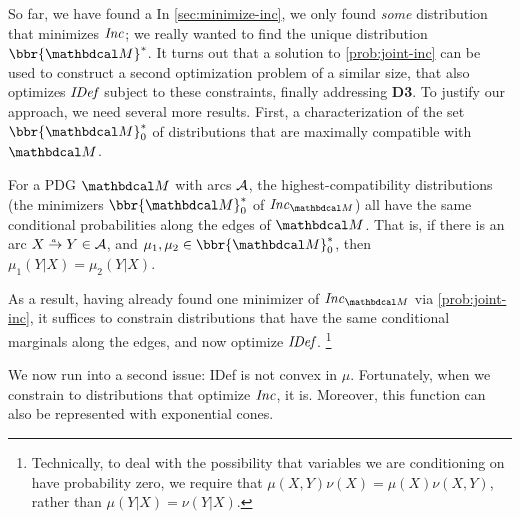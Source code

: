 \documentclass[twoside]{article}
\begin{document}
So far, we have found a
In \cref{sec:minimize-inc}, we only found \emph{some} distribution that minimizes $\mathit{Inc}$; 
we really wanted to find the unique distribution $\bbr{\dg M}^*$.
It turns out that a solution to \eqref{prob:joint-inc} can be used to construct a second optimization problem of a similar size, that also optimizes $\mathit{IDef}_{\!}$ subject to these constraints, finally addressing \textbf{D3}. 
To justify our approach, we need several more results.
First, a characterization of the set $\bbr{\dg M}^*_0$ of distributions that are maximally compatible with $\dg M$. 

\begin{prop}\label{prop:marginonly}
    For a PDG $\dg M$ with arcs $\cal A$,
	the highest-compatibility distributions (the minimizers $\bbr{\dg M}_0^*$ of $\Inc_{\dg M}$) all have the same conditional probabilities along the edges of $\dg M$.   
	That is, if there is an arc $\ed aXY \in \Ar$, and $\mu_1, \mu_2 \in \bbr{\dg M}_0^*$,
    then $\mu_1(Y|X) = \mu_2(Y|X)$.  
\end{prop}

As a result, having already found one minimizer of $\Inc_{\dg M}$ via \eqref{prob:joint-inc}, it suffices to constrain distributions that have the same conditional marginals along the edges, and now optimize $\mathit{IDef}_{\!}$.%
    \footnote{
        Technically, to deal with the possibility that variables we
        are conditioning on have probability zero,  
        we require that $\mu(X,Y)\nu(X) = \mu(X) \nu(X,Y)$, rather than 
        $\mu(Y|X) = \nu(Y|X)$.
    }

We now run into a second issue: IDef is not convex in $\mu$. 
Fortunately, when we constrain to distributions that optimize $\mathit{Inc}$, 
it is.
Moreover, this function can also be represented with exponential cones.
\end{document}
